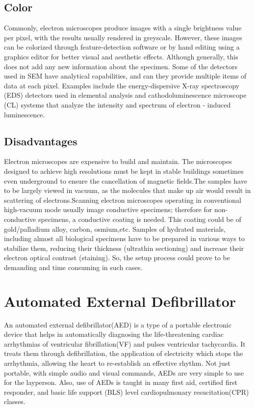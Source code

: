 \documentclass[12pt]{article}
\begin{document}
\begin{normalsize}
\subsection{Color}
Commonly, electron microscopes produce images with a single brightness value per pixel, with the results usually rendered in greyscale. However, these images can be colorized through feature-detection software or by hand editing using a graphics editor for better visual and aesthetic effects. Although generally, this does not add any new information about the specimen.
\linebreak
\linebreak
Some of the detectors used in SEM have analytical capabilities, and can they provide multiple items of data at each pixel. Examples include the energy-dispersive X-ray spectroscopy (EDS) detectors used in elemental analysis and cathodoluminescence microscope (CL) systems that analyze the intensity and spectrum of electron - induced luminescence.

\subsection{Disadvantages}
Electron microscopes are expensive to build and maintain. The microscopes designed to achieve high resolutions must be kept in stable buildings sometimes even underground to ensure the cancellation of magnetic fields.The samples have to be largely viewed in vacuum, as the molecules that make up air would result in scattering of electrons.Scanning electron microscopes operating in conventional high-vacuum mode usually image conductive specimens; therefore for non-conductive specimens, a conductive coating is needed. This coating could be of gold/palladium alloy, carbon, osmium,etc. 
\linebreak
\linebreak
Samples of hydrated materials, including almost all biological specimens have to be prepared in various ways to stabilize them, reducing their thickness (ultrathin sectioning) and increase their electron optical contrast (staining). So, the setup process could prove to be demanding and time consuming in such cases. 
\clearpage

\section{Automated External Defibrillator}
An automated external defibrillator(AED) is a type of a portable electronic device that helps in automatically diagnosing the life-threatening cardiac arrhythmias of ventricular fibrillation(VF) and pulses ventricular tachycardia. It treats them through defibrillation, the application of electricity which stops the arrhythmia, allowing the heart to re-establish an effective rhythm. Not just portable, with simple audio and visual commands, AEDs are very simple to use for the layperson. Also, use of AEDs is taught in many first aid, certified first responder, and basic life support (BLS) level cardiopulmonary resucitation(CPR) classes.


\end{normalsize}
\end{document}
